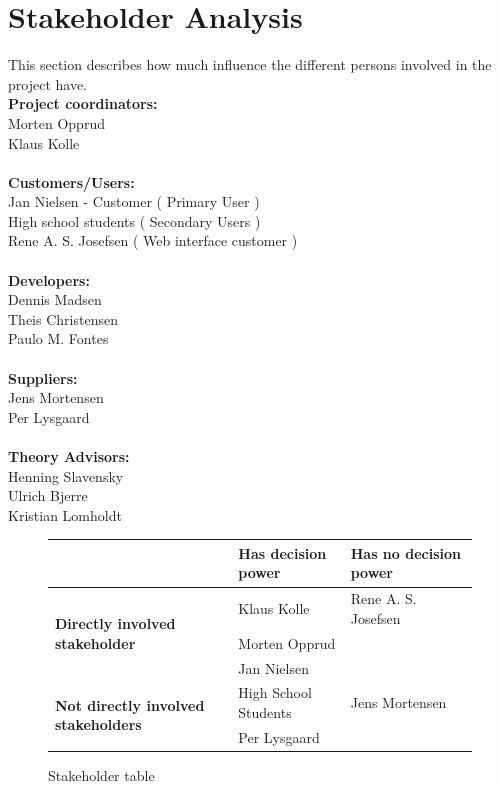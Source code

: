 \section{Stakeholder Analysis}
This section describes how much influence the different persons
involved in the project have.\\[0.2cm]
\textbf{Project coordinators:}\\ Morten Opprud\\ Klaus Kolle\\
\\
\textbf{Customers/Users:}\\
Jan Nielsen - Customer ( Primary User )\\
High school students ( Secondary Users )\\
Rene A. S. Josefsen ( Web interface customer )\\
\\
\textbf{Developers:}\\
Dennis Madsen\\
Theis Christensen\\
Paulo M. Fontes\\
\\
\textbf{Suppliers:}\\
Jens Mortensen\\
Per Lysgaard\\
\\
\textbf{Theory Advisors:}\\
Henning Slavensky\\
Ulrich Bjerre\\
Kristian Lomholdt\\

\begin{figure}[h!]
 \begin{center}
  \begin{tabular}{| l | l | l |}
   \hline
    & \textbf{Has decision power} & \textbf{Has no decision power} \\ \hline
    \multirow{3}{*}{\textbf{Directly involved stakeholder}} 
    	& Klaus Kolle & Rene A. S. Josefsen\\ 
    	& Morten Opprud &  \\ 
    	& Jan Nielsen &  \\ \hline
    \multirow{2}{*}{\textbf{Not directly involved stakeholders}} 
    	& High School Students & Jens Mortensen\\
    	& Per Lysgaard & \\ \hline
   \end{tabular}
  \end{center}
 \caption{Stakeholder table}
\end{figure}

